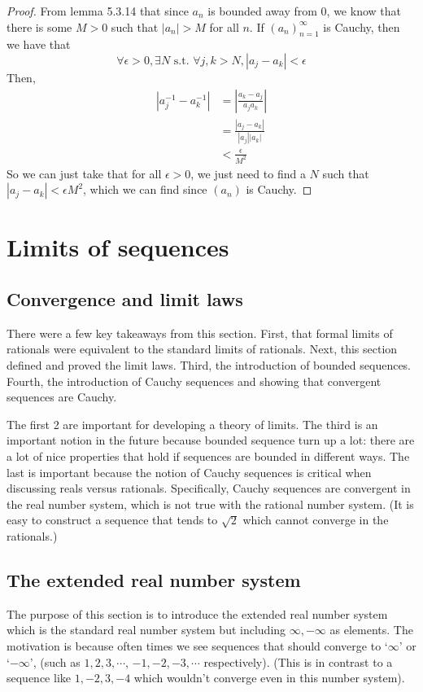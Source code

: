 \documentclass[answers,12pt]{exam}
\newcommand{\suchthat}{\text{ s.t. }}
\begin{document}
\begin{solution}
\begin{proof}
    From lemma 5.3.14 that since $a_n$ is bounded away from 0, we know that there is some $M>0$ such that $|a_n| > M$ for all $n$.
    If ${(a_n)}_{n=1}^{\infty}$ is Cauchy, then we have that 
    \[
        \forall \epsilon >0, \exists N \suchthat \forall j,k > N, |a_j - a_k| < \epsilon
    \]
    Then, 
    \begin{align*}
        |a_j^{-1} - a_k^{-1}| &= \left | \frac{a_k-a_j}{a_j a_k}\right | \\
        &= \frac{\left | a_j - a_k \right |}{\left | a_j \right | \left | a_k \right |} \\
        &< \frac{\epsilon}{M^2}
    \end{align*}
    So we can just take that for all $\epsilon>0$, we just need to find a $N$ such that $|a_j-a_k| < \epsilon M^2$, which we can find since $(a_n)$ is Cauchy.
\end{proof}
\end{solution}

\section{Limits of sequences}

\subsection{Convergence and limit laws}
There were a few key takeaways from this section.
First, that formal limits of rationals were equivalent to the standard limits of rationals.
Next, this section defined and proved the limit laws.
Third, the introduction of bounded sequences.
Fourth, the introduction of Cauchy sequences and showing that convergent sequences are Cauchy.

The first 2 are important for developing a theory of limits. 
The third is an important notion in the future because bounded sequence turn up a lot: there are a lot of nice properties that hold if sequences are bounded in different ways.
The last is important because the notion of Cauchy sequences is critical when discussing reals versus rationals.
Specifically, Cauchy sequences are convergent in the real number system, which is not true with the rational number system.
(It is easy to construct a sequence that tends to $\sqrt{2}$ which cannot converge in the rationals.)

\subsection{The extended real number system}
The purpose of this section is to introduce the extended real number system which is the standard real number system but including $\infty, -\infty$ as elements.
The motivation is because often times we see sequences that should converge to `$\infty$' or `$-\infty$', (such as $1, 2, 3, \cdots$, $-1, -2, -3, \cdots$ respectively).
(This is in contrast to a sequence like $1, -2, 3, -4$ which wouldn't converge even in this number system).
\end{document}
